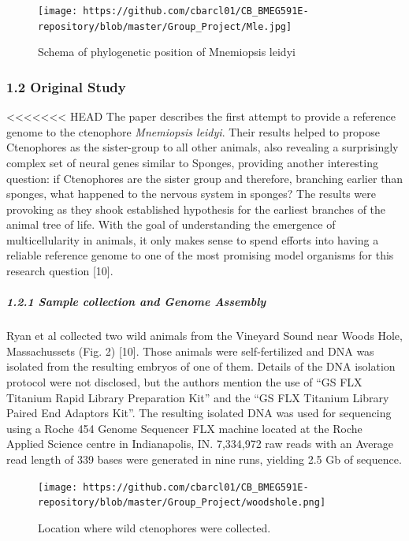 \documentclass[
]{article}
\begin{document}
\begin{figure}
\centering
\texttt{[image: https://github.com/cbarcl01/CB\_BMEG591E-repository/blob/master/Group\_Project/Mle.jpg]}
\caption{Schema of phylogenetic position of Mnemiopsis leidyi}
\end{figure}

\hypertarget{original-study}{%
\subsubsection{1.2 Original Study}\label{original-study}}

\textless\textless\textless\textless\textless\textless\textless{} HEAD
The paper describes the first attempt to provide a reference genome to
the ctenophore \emph{Mnemiopsis leidyi}. Their results helped to propose
Ctenophores as the sister-group to all other animals, also revealing a
surprisingly complex set of neural genes similar to Sponges, providing
another interesting question: if Ctenophores are the sister group and
therefore, branching earlier than sponges, what happened to the nervous
system in sponges? The results were provoking as they shook established
hypothesis for the earliest branches of the animal tree of life. With
the goal of understanding the emergence of multicellularity in animals,
it only makes sense to spend efforts into having a reliable reference
genome to one of the most promising model organisms for this research
question {[}10{]}.

\hypertarget{sample-collection-and-genome-assembly}{%
\subparagraph{1.2.1 Sample collection and Genome
Assembly}\label{sample-collection-and-genome-assembly}}

Ryan et al collected two wild animals from the Vineyard Sound near Woods
Hole, Massachussets (Fig. 2) {[}10{]}. Those animals were
self-fertilized and DNA was isolated from the resulting embryos of one
of them. Details of the DNA isolation protocol were not disclosed, but
the authors mention the use of ``GS FLX Titanium Rapid Library
Preparation Kit'' and the ``GS FLX Titanium Library Paired End Adaptors
Kit''. The resulting isolated DNA was used for sequencing using a Roche
454 Genome Sequencer FLX machine located at the Roche Applied Science
centre in Indianapolis, IN. 7,334,972 raw reads with an Average read
length of 339 bases were generated in nine runs, yielding 2.5 Gb of
sequence.

\begin{figure}
\centering
\texttt{[image: https://github.com/cbarcl01/CB\_BMEG591E-repository/blob/master/Group\_Project/woodshole.png]}
\caption{Location where wild ctenophores were collected.}
\end{figure}
\end{document}

